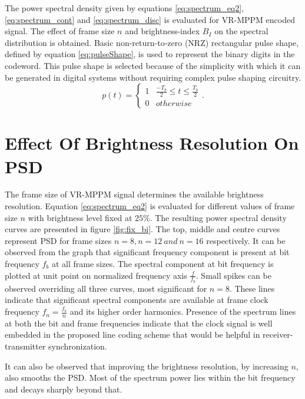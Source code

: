  The power spectral density given by equations \ref{eq:spectrum_eq2}, \ref{eq:spectrum_cont} and \ref{eq:spectrum_disc} is evaluated for VR-MPPM encoded signal. The effect of frame size $n$ and brightness-index $B_I$ on the spectral distribution is obtained. 
Basic non-return-to-zero (NRZ) rectangular pulse shape, defined by equation \ref{eq:pulseShape}, is used to represent the binary digits in the codeword. This pulse shape is selected because of the simplicity with which it can be generated in digital systems without requiring complex pulse shaping circuitry. 
\begin{equation}
	p(t) = \left\{ \begin{array}{cl}
			1&\frac{-T_b}{2} \leq t \leq \frac{T_b}{2} \\
			0&otherwise
			\end{array}
			\right..
\end{equation}


\section{Effect Of Brightness Resolution On PSD}

The frame size of VR-MPPM signal determines the available brightness resolution. Equation \ref{eq:spectrum_eq2} is evaluated for different values of frame size $n$ with brightness level fixed at $25\%$. The resulting power spectral density curves are presented in figure \ref{fig:fix_bi}. The top, middle and centre curves represent PSD for frame sizes $n=8, n=12~and~n=16$ respectively. It can be observed from the graph that significant frequency component is present at bit frequency $f_b$ at all frame sizes. The spectral component at bit frequency is plotted at unit point on normalized frequency axis $\frac{f}{f_b}$. Small spikes can be observed overriding all three curves, most significant for $n=8$. These lines indicate that significant spectral components are available at frame clock frequency $f_n = \frac{f_b}{n}$ and its higher order harmonics. Presence of the spectrum lines at both the bit and frame frequencies indicate that the clock signal is well embedded in the proposed line coding scheme that would be helpful in receiver-transmitter synchronization. 

It can also be observed that improving the brightness resolution, by increasing $n$, also smooths the PSD. Most of the spectrum power lies within the bit frequency and decays sharply beyond that.

